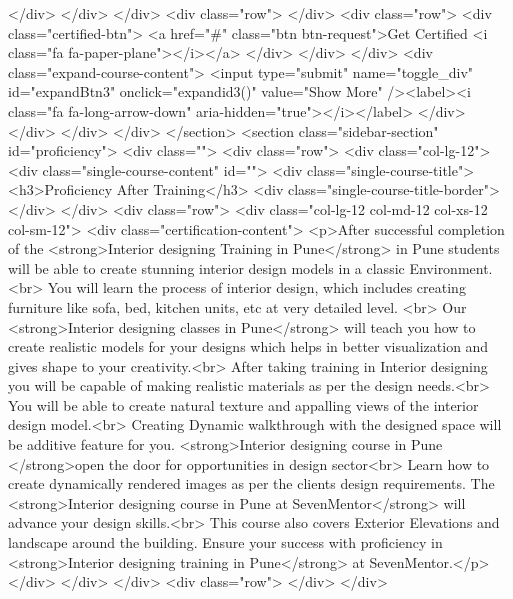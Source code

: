 {</div>
</div>
</div>
<div class="row">
</div>
<div class="row">
<div class="certified-btn">
<a href="#" class="btn btn-request">Get Certified <i class="fa fa-paper-plane"></i></a>
</div>
</div>
</div>
<div class="expand-course-content">
<input type="submit" name="toggle_div" id="expandBtn3" onclick="expandid3()" value="Show More" /><label><i class="fa fa-long-arrow-down" aria-hidden="true"></i></label>
</div>
</div>
</div>
</div>
</section>
<section class="sidebar-section" id="proficiency">
<div class="">
<div class="row">
<div class="col-lg-12">
<div class="single-course-content" id="">
<div class="single-course-title">
<h3>Proficiency After Training</h3>
<div class="single-course-title-border"></div>
</div>
<div class="row">
<div class="col-lg-12 col-md-12 col-xs-12 col-sm-12">
<div class="certification-content">
<p>After successful completion of the <strong>Interior designing Training in Pune</strong> in Pune students will be able to create stunning interior design models in a classic Environment.<br>
You will learn the process of interior design, which includes creating furniture like sofa, bed, kitchen units, etc at very detailed level. <br>
Our <strong>Interior designing classes in Pune</strong> will teach you how to create realistic models for your designs which helps in better visualization and gives shape to your creativity.<br>
After taking training in Interior designing you will be capable of making realistic materials as per the design needs.<br>
You will be able to create natural texture and appalling views of the interior design model.<br>
Creating Dynamic walkthrough with the designed space will be additive feature for you. <strong>Interior designing course in Pune </strong>open the door for opportunities in design sector<br>
Learn how to create dynamically rendered images as per the clients design requirements. The <strong>Interior designing course in Pune at SevenMentor</strong> will advance your design skills.<br>
This course also covers Exterior Elevations and landscape around the building. Ensure your success with proficiency in <strong>Interior designing training in Pune</strong> at SevenMentor.</p>
</div>
</div>
</div>
<div class="row">
</div>
</div>

}
